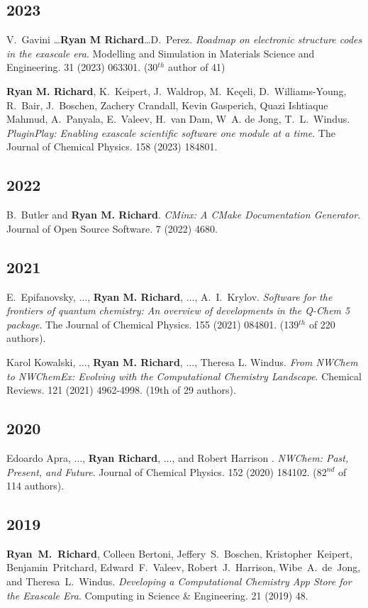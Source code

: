 \documentclass[11pt,a4paper,sans]{moderncv}
\begin{document}
\subsection{2023}
\begin{etaremune}
	\item{V.~Gavini \ldots \textbf{Ryan M Richard}\ldots D.~Perez. 
	      \textit{Roadmap on electronic structure codes in the exascale era}.
		  Modelling and Simulation in Materials Science and Engineering. 31 
		  (2023) 063301. (30$^{th}$ author of 41)
	}
	\item{\textbf{Ryan M. Richard}, K.~Keipert, J.~Waldrop, 
	      M.~Keçeli, D.~Williams-Young, R.~Bair, J.~Boschen, 
		  Zachery Crandall, Kevin Gasperich, Quazi Ishtiaque Mahmud, 
		  A.~Panyala, E.~Valeev, H.~van Dam, W~A. de Jong, 
		  T.~L.~Windus. \textit{PluginPlay: Enabling exascale scientific 
		  software one module at a time}. The Journal of Chemical Physics. 158 
		  (2023) 184801.
	}
	\subsection{2022}
	\item{B.~Butler and \textbf{Ryan M. Richard}. \textit{CMinx: A CMake 
	      Documentation Generator}. Journal of Open Source Software. 7 (2022) 
		  4680.
	}
	\subsection{2021}
	\item{E.~Epifanovsky, $\ldots$, \textbf{Ryan M. Richard}, $\ldots$,
	A.~I.~Krylov. \textit{Software for the frontiers of quantum chemistry: An
	overview of developments in the Q-Chem 5 package}. The Journal of Chemical
	Physics. 155 (2021) 084801. (139$^{th}$ of 220 authors).}
	\item{Karol Kowalski, $\ldots$, \textbf{Ryan M. Richard}, $\ldots$, Theresa L. Windus. \textit{From NWChem to NWChemEx: Evolving with the Computational Chemistry Landscape}. Chemical Reviews. 121 (2021) 4962-4998. (19th of 29 authors).}
	\subsection{2020}
	\item{Edoardo Apra, $\ldots$, \textbf{Ryan Richard}, $\ldots$, and Robert Harrison . \textit{NWChem: Past, Present, and Future}. Journal of Chemical Physics. 152 (2020) 184102. (82$^{nd}$ of 114 authors).}
	\subsection{2019}
	\item{\textbf{Ryan~M.~Richard}, Colleen Bertoni, Jeffery~S.~Boschen, Kristopher~Keipert, Benjamin~Pritchard, Edward~F.~Valeev, Robert~J.~Harrison, Wibe~A.~de~Jong, and Theresa~L.~Windus. \textit{Developing a Computational Chemistry App Store for the Exascale Era}. Computing in Science \& Engineering. 21 (2019) 48.}

\end{etaremune}
\end{document}
